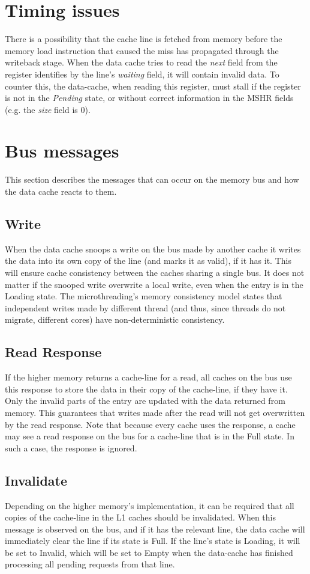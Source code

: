 \section{Timing issues}
There is a possibility that the cache line is fetched from memory before the memory load instruction that caused the miss has propagated through the writeback stage. When the data cache tries to read the \emph{next} field from the register identifies by the line's \emph{waiting} field, it will contain invalid data. To counter this, the data-cache, when reading this register, must stall if the register is not in the \emph{Pending} state, or without correct information in the {MSHR} fields (e.g. the \emph{size} field is 0).

\section{Bus messages}
This section describes the messages that can occur on the memory bus and how the data cache reacts to them.

\subsection{Write}
When the data cache snoops a write on the bus made by another cache it writes the data into its own copy of the line (and marks it as valid), if it has it. This will ensure cache consistency between the caches sharing a single bus. It does not matter if the snooped write overwrite a local write, even when the entry is in the Loading state. The microthreading's memory consistency model states that independent writes made by different thread (and thus, since threads do not migrate, different cores) have non-deterministic consistency.

\subsection{Read Response}
If the higher memory returns a cache-line for a read, all caches on the bus use this response to store the data in their copy of the cache-line, if they have it. Only the invalid parts of the entry are updated with the data returned from memory. This guarantees that writes made after the read will not get overwritten by the read response. Note that because every cache uses the response, a cache may see a read response on the bus for a cache-line that is in the Full state. In such a case, the response is ignored.

\subsection{Invalidate}
Depending on the higher memory's implementation, it can be required that all copies of the cache-line in the L1 caches should be invalidated. When this message is observed on the bus, and if it has the relevant line, the data cache will immediately clear the line if its state is Full. If the line's state is Loading, it will be set to Invalid, which will be set to Empty when the data-cache has finished processing all pending requests from that line.


